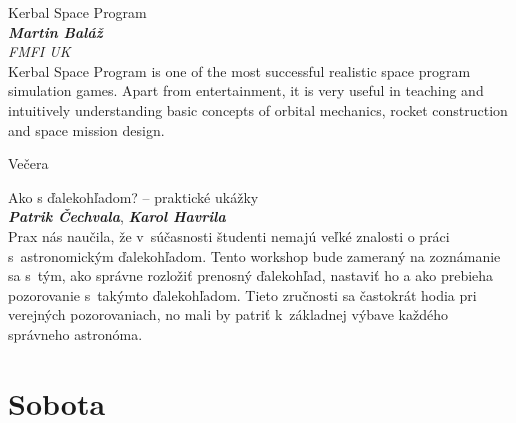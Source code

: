 \documentclass[a4paper]{report}
\begin{document}
                    \begin{tcolorbox}[
                                    colback=white,
                    colframe=black!70!white,
                                fonttitle=\Large\bfseries,
                title=18:00
            ]
                {\Large Kerbal Space Program}
                                                            \\ \textbf{\textit{Martin Baláž}}
                                        \\ \textit{FMFI UK}                                \\[2ex]Kerbal Space Program is one of the most successful realistic space program simulation games. Apart from entertainment, it is very useful in teaching and intuitively understanding basic concepts of orbital mechanics, rocket construction and space mission design.
            \end{tcolorbox}
                    \begin{tcolorbox}[
                                    colback=red!10,
                    colframe=red!50!black,
                                fonttitle=\Large\bfseries,
                title=19:00
            ]
                {\Large Večera}
                                            \end{tcolorbox}
                    \begin{tcolorbox}[
                                    colback=blue!10,
                    colframe=black!50!blue,
                                fonttitle=\Large\bfseries,
                title=21:00
            ]
                {\Large Ako s ďalekohľadom? -- praktické ukážky}
                                                            \\                             \textit{\textbf{Patrik Čechvala}},                                                     \textit{\textbf{Karol Havrila}}                                                                                                \\[2ex]Prax nás naučila, že v súčasnosti študenti nemajú veľké znalosti o práci s astronomickým ďalekohľadom. Tento workshop bude zameraný na zoznámanie sa s tým, ako správne rozložiť prenosný ďalekohľad, nastaviť ho a ako prebieha pozorovanie s takýmto ďalekohľadom. Tieto zručnosti sa častokrát hodia pri verejných pozorovaniach, no mali by patriť k základnej výbave každého správneho astronóma.
            \end{tcolorbox}
                    \section{Sobota}
\end{document}
